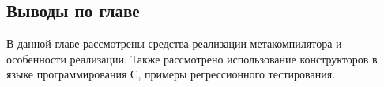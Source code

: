 
\subsection*{Выводы по главе}
В данной главе рассмотрены средства реализации метакомпилятора и особенности реализации.
Также рассмотрено использование конструкторов в языке программирования С, примеры регрессионного тестирования.

